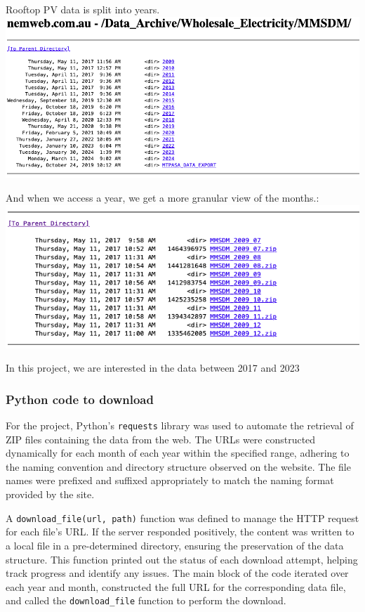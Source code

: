 \documentclass[
]{article}
\begin{document}
Rooftop PV data is split into years. \includegraphics{img/nemweb-1.png}

And when we access a year, we get a more granular view of the months.:
\includegraphics{img/nemweb-2.png}

In this project, we are interested in the data between 2017 and 2023

\subsubsection{Python code to download}\label{python-code-to-download}

For the project, Python's \texttt{requests} library was used to automate
the retrieval of ZIP files containing the data from the web. The URLs
were constructed dynamically for each month of each year within the
specified range, adhering to the naming convention and directory
structure observed on the website. The file names were prefixed and
suffixed appropriately to match the naming format provided by the site.

A \texttt{download\_file(url,\ path)} function was defined to manage the
HTTP request for each file's URL. If the server responded positively,
the content was written to a local file in a pre-determined directory,
ensuring the preservation of the data structure. This function printed
out the status of each download attempt, helping track progress and
identify any issues. The main block of the code iterated over each year
and month, constructed the full URL for the corresponding data file, and
called the \texttt{download\_file} function to perform the download.
\end{document}
